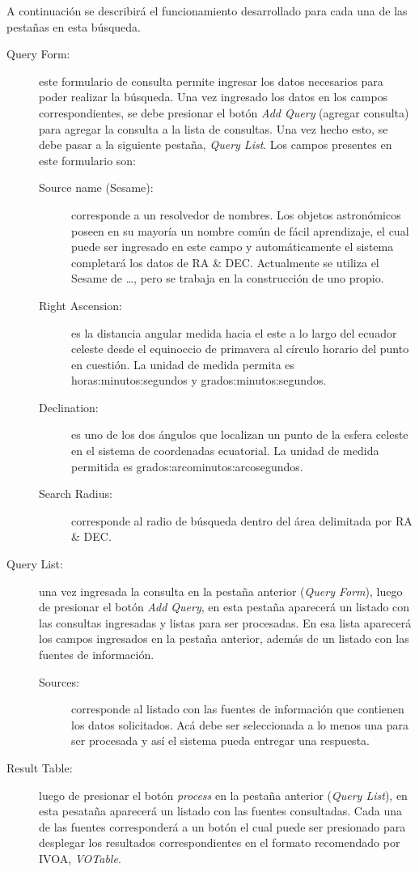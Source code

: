 A continuación se describirá el funcionamiento desarrollado para cada
una de las pestañas en esta búsqueda.

\begin{description}
  \item [Query Form:] este formulario de consulta permite ingresar los
    datos necesarios para poder realizar la búsqueda. Una vez
    ingresado los datos en los campos correspondientes, se debe
    presionar el botón \emph{Add Query} (agregar consulta) para
    agregar la consulta a la lista de consultas. Una vez hecho esto,
    se debe pasar a la siguiente pestaña, \emph{Query List}. Los
    campos presentes en este formulario son:
    \begin{description}
      \item [Source name (Sesame):] corresponde a un resolvedor de
	nombres. Los objetos astronómicos poseen en su mayoría un
	nombre común de fácil aprendizaje, el cual puede ser ingresado
	en este campo y automáticamente el sistema completará los
	datos de RA \& DEC. Actualmente se utiliza el Sesame de
	{\ldots}, pero se trabaja en la construcción de uno propio.
      \item [Right Ascension:] es la distancia angular medida hacia el
	este a lo largo del ecuador celeste desde el equinoccio de
	primavera al círculo horario del punto en cuestión. La unidad
	de medida permita es horas:minutos:segundos y grados:minutos:segundos.
      \item [Declination:] es uno de los dos ángulos que localizan un
	punto de la esfera celeste en el sistema de coordenadas
	ecuatorial. La unidad de medida permitida es
	grados:arcominutos:arcosegundos.
      \item [Search Radius:] corresponde al radio de búsqueda dentro
	del área delimitada por RA \& DEC.
    \end{description}
  \item [Query List:] una vez ingresada la consulta en la pestaña
    anterior (\emph{Query Form}), luego de presionar el botón
    \emph{Add Query}, en esta pestaña aparecerá un listado con las
    consultas ingresadas y listas para ser procesadas. En esa lista
    aparecerá los campos ingresados en la pestaña anterior, además de
    un listado con las fuentes de información.
    \begin{description}
      \item [Sources:] corresponde al listado con las fuentes de
	información que contienen los datos solicitados. Acá debe ser
	seleccionada a lo menos una para ser procesada y así el
	sistema pueda entregar una respuesta.
    \end{description}
  \item [Result Table:] luego de presionar el botón \emph{process} en
    la pestaña anterior (\emph{Query List}), en esta pesataña
    aparecerá un listado con las fuentes consultadas. Cada una de las
    fuentes corresponderá a un botón el cual puede ser presionado para
    desplegar los resultados correspondientes en el formato
    recomendado por IVOA, \emph{VOTable}.
\end{description}  


